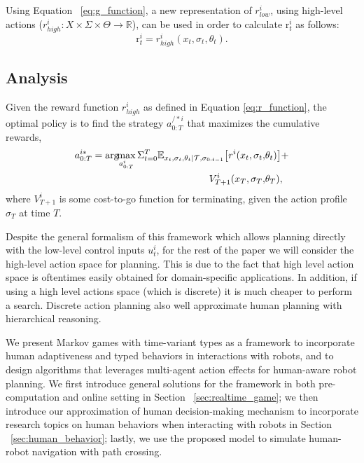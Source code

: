 \documentclass[letterpaper, 10 pt, conference]{ieeeconf}  %
\newcommand{\argmax}{\arg\!\!\max}
\begin{document}
Using Equation ~\ref{eq:g_function}, a new representation of 
$r^i_{low}$, using high-level actions ($r^i_{high}:X\times \Sigma \times \Theta \rightarrow \mathbb{R}$), can be used in order to calculate r$^i_t$ as follows:
\begin{equation}\label{eq:r_function}
\text{r}^i_t = r^i_{high}(x_t,\sigma_t,\theta_t).
\end{equation}

\subsection{Analysis}
Given the reward function $r^i_{high}$ as defined in Equation \ref{eq:r_function}, the optimal policy is to find the strategy $a^{/*i}_{0:T}$ that maximizes the cumulative rewards,
\begin{equation}\label{eq:optimal}
\begin{aligned}
  a^{i*}_{0:T} = \argmax_{a^i_{0:T}} 
  \Sigma_{t=0}^{T} 
  \mathbb{E}_{x_t,\sigma_{t},\theta_t|\mathcal{T},\sigma_{0:t-1}} \big{[}
  r^i(x_t,\sigma_t,&\theta_t)\big{]}+ \\ 
  V^i_{T+1}(x_T,\sigma_T,&\theta_T), 
\end{aligned}
\end{equation}
where $V^i_{T+1}$ is some cost-to-go function for terminating, given the action profile $\sigma_T$ at time $T$.

Despite the general formalism of this framework which allows planning directly 
with the low-level control inputs $u^i_t$, 
for the rest of the paper we will consider the high-level action space for planning. This is due to the fact that high level action space is oftentimes easily obtained for domain-specific applications. In addition, if using a high level actions space (which is discrete) it is much cheaper to perform a search. Discrete action planning also well approximate human planning with hierarchical reasoning.  

We present Markov games with time-variant types as a framework to incorporate human adaptiveness and typed behaviors in interactions with robots, and to design algorithms that leverages multi-agent action effects for human-aware robot planning.   
We first introduce general solutions for the framework in both 
pre-computation and online setting in Section ~\ref{sec:realtime_game}; we 
then introduce our approximation of human decision-making mechanism to 
incorporate research topics on human behaviors when interacting with robots in 
Section ~\ref{sec:human_behavior}; lastly, we use the proposed model to 
simulate human-robot navigation with path crossing.
\end{document}
